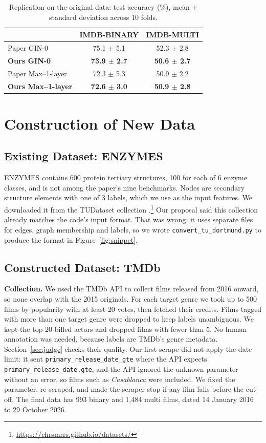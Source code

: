 \documentclass[11pt]{article}
\begin{document}
\begin{table}[t]
\centering
\small
\begin{tabular}{lcc}
\toprule
 & IMDB-BINARY & IMDB-MULTI \\
\midrule
Paper GIN-0 & 75.1 $\pm$ 5.1 & 52.3 $\pm$ 2.8 \\
\textbf{Ours GIN-0} & \textbf{73.9 $\pm$ 2.7} & \textbf{50.6 $\pm$ 2.7} \\
\midrule
Paper Max--1-layer & 72.3 $\pm$ 5.3 & 50.9 $\pm$ 2.2 \\
\textbf{Ours Max--1-layer} & \textbf{72.6 $\pm$ 3.0} & \textbf{50.9 $\pm$ 2.8} \\
\bottomrule
\end{tabular}
\caption{Replication on the original data: test accuracy (\%), mean $\pm$ standard deviation across 10 folds.}
\label{tab:replication}
\end{table}

\section{Construction of New Data}
\label{sec:newdata}

\subsection{Existing Dataset: ENZYMES}

ENZYMES \citep{borgwardt2005protein} contains 600 protein tertiary structures, 100 for each of 6 enzyme classes, and is not among the paper's nine benchmarks. Nodes are secondary structure elements with one of 3 labels, which we use as the input features. We downloaded it from the TUDataset collection \citep{morris2020tudataset}.\footnote{\url{https://chrsmrrs.github.io/datasets/}} Our proposal said this collection already matches the code's input format. That was wrong: it uses separate files for edges, graph membership and labels, so we wrote \texttt{convert\_tu\_dortmund.py} to produce the format in Figure~\ref{fig:snippet}.

\subsection{Constructed Dataset: TMDb}

\textbf{Collection.} We used the TMDb API \citep{tmdb} to collect films released from 2016 onward, so none overlap with the 2015 originals. For each target genre we took up to 500 films by popularity with at least 20 votes, then fetched their credits. Films tagged with more than one target genre were dropped to keep labels unambiguous. We kept the top 20 billed actors and dropped films with fewer than 5. No human annotation was needed, because labels are TMDb's genre metadata. Section~\ref{sec:judge} checks their quality. Our first scrape did not apply the date limit: it sent \texttt{primary\_release\_date\_gte} where the API expects \texttt{primary\_release\_date.gte}, and the API ignored the unknown parameter without an error, so films such as \textit{Casablanca} were included. We fixed the parameter, re-scraped, and made the scraper stop if any film falls before the cut-off. The final data has 993 binary and 1,484 multi films, dated 14 January 2016 to 29 October 2026.
\end{document}
